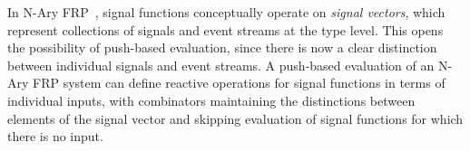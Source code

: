 In N-Ary FRP~\cite{Sculthorpe2011}, signal functions conceptually operate on {\em signal vectors}, which represent collections
of signals and event streams at the type level. This opens the possibility of push-based evaluation, since there
is now a clear distinction between individual signals and event streams. A push-based evaluation of an N-Ary FRP
system can define reactive operations for signal functions in terms of individual inputs, with combinators
maintaining the distinctions between elements of the signal vector and skipping evaluation of signal functions for
which there is no input.

